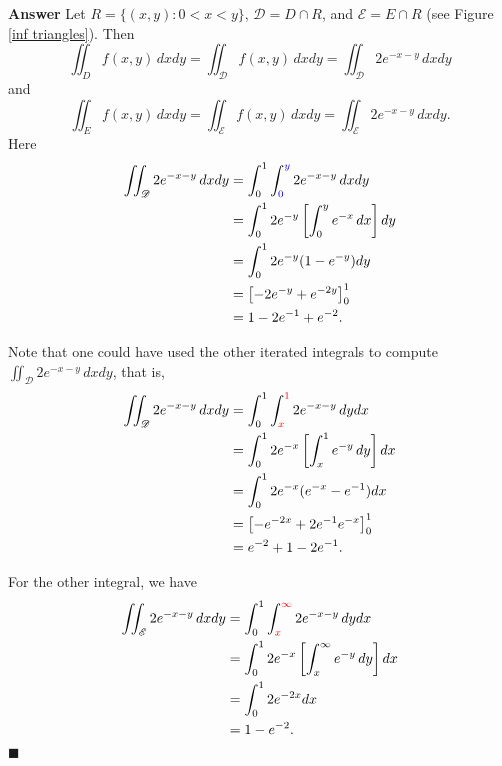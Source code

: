 \documentclass[12pt,letterpaper]{book}
\def\red{\textcolor{red}}
\def\blue{\textcolor{blue}}
\numberwithin{equation}{section}
\theoremstyle{definition}
\newenvironment{answer}{\noindent\textbf{Answer}}{\hfill$\blacksquare$\vspace{0.1in}}
\begin{document}
\begin{answer}
Let $R=\{(x,y):0<x<y\}$, $\mathscr{D}=D\cap R$, and $\mathscr{E}=E\cap R$ (see Figure \ref{inf triangles}). Then 
$$\iint_D f(x,y)\,dxdy=\iint_{\mathscr{D}} f(x,y)\,dxdy=\iint_{\mathscr{D}} 2e^{-x-y}\,dxdy$$ 
and  
$$\iint_E f(x,y)\,dxdy=\iint_{\mathscr{E}} f(x,y)\,dxdy=\iint_{\mathscr{E}} 2e^{-x-y}\,dxdy.$$
Here
\begin{align*}
\iint_{\mathscr{D}} 2e^{-x-y}\,dxdy&=\int_0^1 \int_{\blue{0}}^{\blue{y}} 2e^{-x-y}\,dxdy\\
&=\int_0^1 2e^{-y}\left[\int_0^{y}e^{-x}\,dx\right]dy\\
&=\int_0^1 2e^{-y}(1-e^{-y})dy\\
&=\left[-2e^{-y}+e^{-2y}\right]_0^1\\
&=1-2e^{-1}+e^{-2}.
\end{align*}

Note that one could have used the other iterated integrals to compute $\displaystyle{\iint_{\mathscr{D}} 2e^{-x-y}\,dxdy}$, that is, 
\begin{align*}\iint_{\mathscr{D}} 2e^{-x-y}\,dxdy&=\int_0^1 \int_{\red{x}}^{\red{1}}2e^{-x-y}\,dydx\\
&=\int_0^1 2e^{-x}\left[\int_{x}^{1}e^{-y}\,dy\right]dx\\
&=\int_0^1 2e^{-x}(e^{-x}-e^{-1})dx\\
&=\left[-e^{-2x}+2e^{-1}e^{-x}\right]_0^1\\
&=e^{-2}+1-2e^{-1}.
\end{align*}

For the other integral, we have
\begin{align*} \iint_{\mathscr{E}} 2e^{-x-y}\,dxdy&=\int_0^1 \int_{\red{x}}^{\red{\infty}} 2e^{-x-y}\,dydx\\
&=\int_0^1 2e^{-x}\left[\int_{x}^\infty e^{-y}\,dy \right]dx\\
&=\int_0^1 2e^{-2x}dx\\
&=1-e^{-2}.
\end{align*}
\end{answer}
\end{document}
